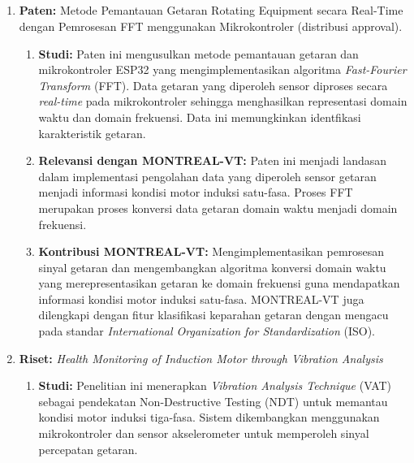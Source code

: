 \documentclass{elsinta}
\begin{document}
\subsection{\RelResearchPatentsTitle}
\begin{enumerate}
    \item \textbf{Paten:} Metode Pemantauan Getaran Rotating Equipment secara Real-Time dengan Pemrosesan FFT menggunakan Mikrokontroler (distribusi approval)\cite{Silaban2026}.
    \begin{enumerate}
        \item \textbf{Studi:} Paten ini mengusulkan metode pemantauan getaran dan mikrokontroler ESP32 yang mengimplementasikan algoritma \textit{Fast-Fourier Transform} (FFT). Data getaran yang diperoleh sensor diproses secara \textit{real-time} pada mikrokontroler sehingga menghasilkan representasi domain waktu dan domain frekuensi. Data ini memungkinkan identfikasi karakteristik getaran.
        \item \textbf{Relevansi dengan  MONTREAL-VT:} Paten ini menjadi landasan dalam implementasi pengolahan data yang diperoleh sensor getaran menjadi informasi kondisi motor induksi satu-fasa. Proses FFT merupakan proses konversi data getaran domain waktu menjadi domain frekuensi.
        \item \textbf{Kontribusi  MONTREAL-VT:} Mengimplementasikan pemrosesan sinyal getaran dan mengembangkan algoritma konversi domain waktu yang merepresentasikan getaran ke domain frekuensi guna mendapatkan informasi kondisi motor induksi satu-fasa. MONTREAL-VT juga dilengkapi dengan fitur klasifikasi keparahan getaran dengan mengacu pada standar \textit{International Organization for Standardization} (ISO).
    \end{enumerate}
    \item \textbf{Riset:} \textit{Health Monitoring of Induction Motor through Vibration Analysis} \cite{Sonowal2019}
    \begin{enumerate}
        \item \textbf{Studi:} Penelitian ini menerapkan \textit{Vibration Analysis Technique} (VAT) sebagai pendekatan Non-Destructive Testing (NDT) untuk memantau kondisi motor induksi tiga-fasa. Sistem dikembangkan menggunakan mikrokontroler dan sensor akselerometer untuk memperoleh sinyal percepatan getaran.

\end{enumerate}
\end{enumerate}
\end{document}
